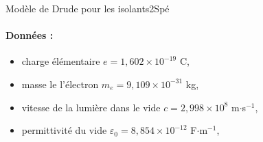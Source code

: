 \begin{exercise}{Modèle de Drude pour les isolants}{2}{Spé}
\paragraph{Données :}
\begin{itemize}
    \item charge élémentaire $e = 1,602\times 10^{-19}$ C,
    \item masse le l'électron $m_e = 9,109\times 10^{-31}$ kg,
    \item vitesse de la lumière dans le vide $c = 2,998 \times 10^8$ m$\cdot$s$^{-1}$,
    \item permittivité du vide $\varepsilon_0 = 8,854\times 10^{-12}$ F$\cdot$m$^{-1}$,
\end{itemize}
\end{exercise}